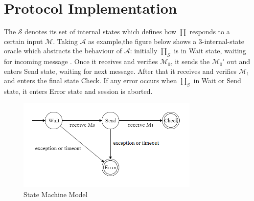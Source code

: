 \section*{Protocol Implementation}
The $\mathcal{S}$ denotes its set of internal states which defines how $\prod$ responds to a certain input $\mathcal{M}$. Taking $\mathcal{A}$ as example,the figure below shows a 3-internal-state oracle which abstracts the behaviour of $\mathcal{A}$: initially $\prod_S$ is in Wait state, waiting for incoming message
. Once it receives and verifies $\mathcal{M}_0$, it sends the $\mathcal{M}_0'$ out and enters Send state, waiting for next message. After that it receives and verifies  $\mathcal{M}_1$ and enters the final state Check. If any error occurs when $\prod_S$ in Wait or Send state, it enters Error state and session is aborted.

\begin{figure}[h!]
\centering
\includegraphics[width=0.8\textwidth,natwidth=585,natheight=298]{statemachinefigure.png}
\caption{State Machine Model}
\end{figure}